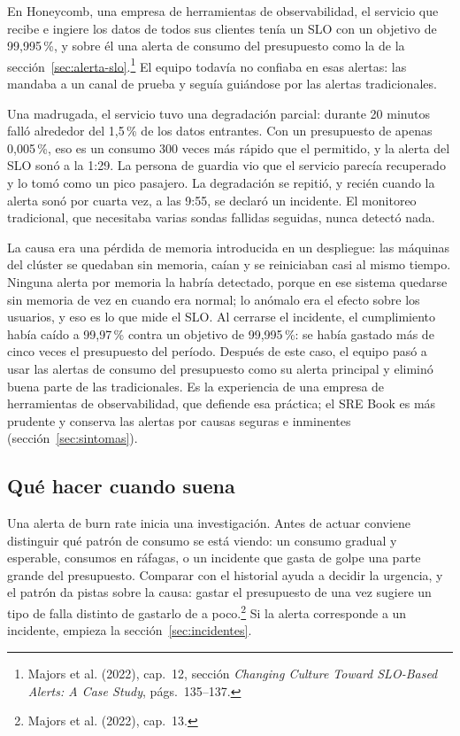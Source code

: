 \documentclass[variant=apuntes,cover=institutional,mode=screen]{ua-engineering-v6-article}
\begin{document}
En Honeycomb, una empresa de herramientas de observabilidad, el servicio que recibe e ingiere los datos de todos sus clientes tenía un SLO con un objetivo de 99,995\,\%, y sobre él una alerta de consumo del presupuesto como la de la sección~\ref{sec:alerta-slo}.\footnote{Majors et al. (2022), cap.~12, sección \emph{Changing Culture Toward SLO-Based Alerts: A Case Study}, págs.~135--137.} El equipo todavía no confiaba en esas alertas: las mandaba a un canal de prueba y seguía guiándose por las alertas tradicionales.

Una madrugada, el servicio tuvo una degradación parcial: durante 20 minutos falló alrededor del 1,5\,\% de los datos entrantes. Con un presupuesto de apenas 0,005\,\%, eso es un consumo 300 veces más rápido que el permitido, y la alerta del SLO sonó a la 1:29. La persona de guardia vio que el servicio parecía recuperado y lo tomó como un pico pasajero. La degradación se repitió, y recién cuando la alerta sonó por cuarta vez, a las 9:55, se declaró un incidente. El monitoreo tradicional, que necesitaba varias sondas fallidas seguidas, nunca detectó nada.

La causa era una pérdida de memoria introducida en un despliegue: las máquinas del clúster se quedaban sin memoria, caían y se reiniciaban casi al mismo tiempo. Ninguna alerta por memoria la habría detectado, porque en ese sistema quedarse sin memoria de vez en cuando era normal; lo anómalo era el efecto sobre los usuarios, y eso es lo que mide el SLO. Al cerrarse el incidente, el cumplimiento había caído a 99,97\,\% contra un objetivo de 99,995\,\%: se había gastado más de cinco veces el presupuesto del período. Después de este caso, el equipo pasó a usar las alertas de consumo del presupuesto como su alerta principal y eliminó buena parte de las tradicionales. Es la experiencia de una empresa de herramientas de observabilidad, que defiende esa práctica; el SRE Book es más prudente y conserva las alertas por causas seguras e inminentes (sección~\ref{sec:sintomas}).

\subsection{Qué hacer cuando suena}

Una alerta de burn rate inicia una investigación. Antes de actuar conviene distinguir qué patrón de consumo se está viendo: un consumo gradual y esperable, consumos en ráfagas, o un incidente que gasta de golpe una parte grande del presupuesto. Comparar con el historial ayuda a decidir la urgencia, y el patrón da pistas sobre la causa: gastar el presupuesto de una vez sugiere un tipo de falla distinto de gastarlo de a poco.\footnote{Majors et al. (2022), cap.~13.} Si la alerta corresponde a un incidente, empieza la sección~\ref{sec:incidentes}.
\end{document}
